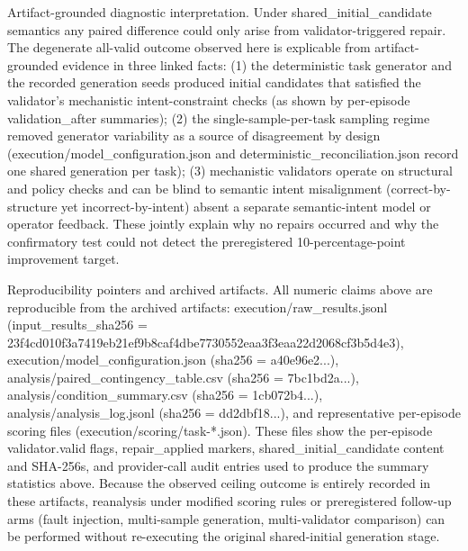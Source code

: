 \documentclass[conference]{IEEEtran}
\begin{document}
Artifact-grounded diagnostic interpretation. Under shared\_initial\_candidate semantics any paired difference could only arise from validator-triggered repair. The degenerate all-valid outcome observed here is explicable from artifact-grounded evidence in three linked facts: (1) the deterministic task generator and the recorded generation seeds produced initial candidates that satisfied the validator's mechanistic intent-constraint checks (as shown by per-episode validation\_after summaries); (2) the single-sample-per-task sampling regime removed generator variability as a source of disagreement by design (execution/model\_configuration.json and deterministic\_reconciliation.json record one shared generation per task); (3) mechanistic validators operate on structural and policy checks and can be blind to semantic intent misalignment (correct-by-structure yet incorrect-by-intent) absent a separate semantic-intent model or operator feedback. These jointly explain why no repairs occurred and why the confirmatory test could not detect the preregistered 10-percentage-point improvement target.

Reproducibility pointers and archived artifacts. All numeric claims above are reproducible from the archived artifacts: execution/raw\_results.jsonl (input\_results\_sha256 = 23f4cd01\allowbreak{}0f3a7419\allowbreak{}eb21ef9b\allowbreak{}8caf4dbe\allowbreak{}7730552e\allowbreak{}aa3f3eaa\allowbreak{}22d2068c\allowbreak{}f3b5d4e3), execution/model\_configuration.json (sha256 = a40e96e2...), analysis/paired\_contingency\_table.csv (sha256 = 7bc1bd2a...), analysis/condition\_summary.csv (sha256 = 1cb072b4...), analysis/analysis\_log.jsonl (sha256 = dd2dbf18...), and representative per-episode scoring files (execution/scoring/task-*.json). These files show the per-episode validator.valid flags, repair\_applied markers, shared\_initial\_candidate content and SHA-256s, and provider-call audit entries used to produce the summary statistics above. Because the observed ceiling outcome is entirely recorded in these artifacts, reanalysis under modified scoring rules or preregistered follow-up arms (fault injection, multi-sample generation, multi-validator comparison) can be performed without re-executing the original shared-initial generation stage.
\end{document}
